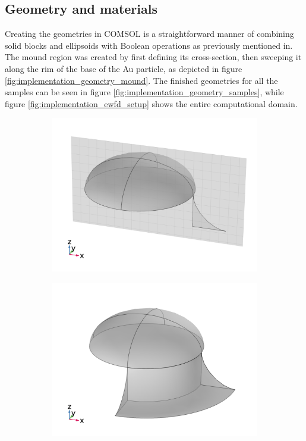 \subsection{Geometry and materials}
Creating the geometries in COMSOL is a straightforward manner of combining solid blocks and ellipsoids with Boolean operations as previously mentioned in. The mound region was created by first defining its cross-section, then sweeping it along the rim of the base of the Au particle, as depicted in figure \ref{fig:implementation_geometry_mound}. The finished geometries for all the samples can be seen in figure \ref{fig:implementation_geometry_samples}, while figure \ref{fig:implementation_ewfd_setup} shows the entire computational domain.
\begin{figure}[htb!]
    \begin{subfigure}{0.3\textwidth}
        \centering
        \includegraphics[width=0.8\linewidth, trim=0cm 0 0 0cm, clip]{figures/ch4/implem/geometry/Sample5A_mound_workplane.png}
    \end{subfigure}
    \begin{subfigure}{0.3\textwidth}
        \centering
        \includegraphics[width=0.8\linewidth, trim=0cm 0 0 0cm, clip]{figures/ch4/implem/geometry/Sample5A_mound_sweep.png}

\end{subfigure}
\end{figure}
